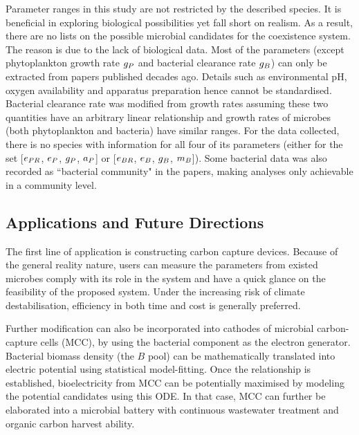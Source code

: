 \documentclass[../thesis.tex]{subfiles} %
\begin{document}
Parameter ranges in this study are not restricted by the described species.  It is beneficial in exploring biological possibilities yet fall short on realism.  As a result, there are no lists on the possible microbial candidates for the coexistence system.  The reason is due to the lack of biological data.  Most of the parameters (except phytoplankton growth rate $g_P$ and bacterial clearance rate $g_B$) can only be extracted from papers published decades ago.  Details such as environmental pH, oxygen availability and apparatus preparation hence cannot be standardised.  Bacterial clearance rate was modified from growth rates assuming these two quantities have an arbitrary linear relationship and growth rates of microbes (both phytoplankton and bacteria) have similar ranges.  For the data collected, there is no species with information for all four of its parameters (either for the set [$e_{PR}$, $e_P$, $g_P$, $a_P$] or [$e_{BR}$, $e_B$, $g_B$, $m_B$]).  Some bacterial data was also recorded as ``bacterial community" in the papers,\autocite{cochran1988estimation} making analyses only achievable in a community level.

\subsection{Applications and Future Directions}
The first line of application is constructing carbon capture devices.  Because of the general reality nature, users can measure the parameters from existed microbes comply with its role in the system and have a quick glance on the feasibility of the proposed system.  Under the increasing risk of climate destabilisation,\autocite{notz2016observed,schuur2015climate} efficiency in both time and cost is generally preferred.

Further modification can also be incorporated into cathodes of microbial carbon-capture cells (MCC), \autocite{varanasi2020improvement,mohamed2020bioelectricity,neethu2018enhancement,pandit2012microbial} by using the bacterial component as the electron generator.  Bacterial biomass density (the $B$ pool) can be mathematically translated into electric potential using statistical model-fitting.  Once the relationship is established, bioelectricity from MCC can be potentially maximised by modeling the potential candidates using this ODE.  In that case, MCC can further be elaborated into a microbial battery with continuous wastewater treatment\autocite{mohamed2020bioelectricity} and organic carbon harvest ability.
\end{document}
